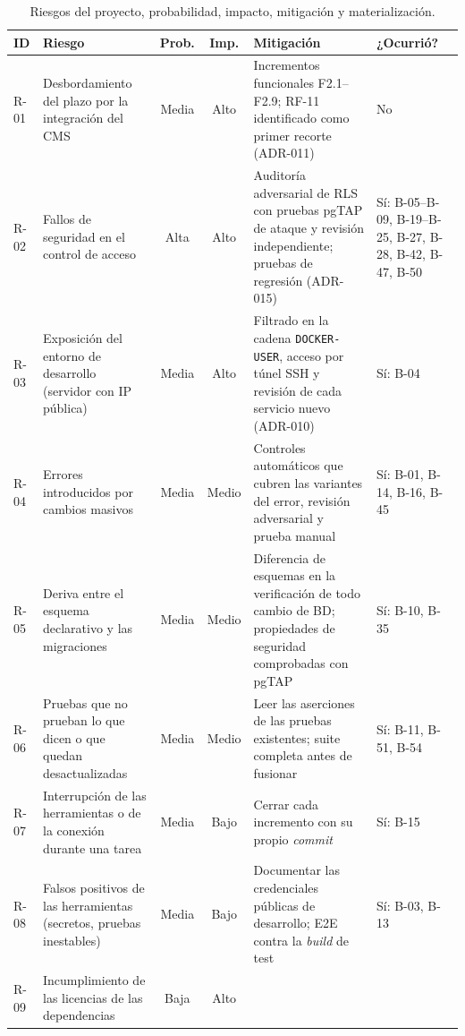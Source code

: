 \begin{table}[htbp]
  \centering
  \footnotesize
  \caption{Riesgos del proyecto, probabilidad, impacto, mitigación y materialización.}
  \label{tab:plan-riesgos}
  \setlength{\tabcolsep}{4pt}
  \begin{tabularx}{\textwidth}{@{}l>{\raggedright\arraybackslash}p{2.8cm}cc>{\raggedright\arraybackslash}X>{\raggedright\arraybackslash}p{2.2cm}@{}}
    \toprule
    \textbf{ID} & \textbf{Riesgo} & \textbf{Prob.} & \textbf{Imp.} & \textbf{Mitigación} & \textbf{¿Ocurrió?} \\
    \midrule
    R-01 & Desbordamiento del plazo por la integración del CMS & Media & Alto &
      Incrementos funcionales F2.1--F2.9; RF-11 identificado como primer recorte (ADR-011) & No \\
    R-02 & Fallos de seguridad en el control de acceso & Alta & Alto &
      Auditoría adversarial de RLS con pruebas pgTAP de ataque y revisión independiente; pruebas de regresión (ADR-015) & Sí: B-05--B-09, B-19--B-25, B-27, B-28, B-42, B-47, B-50 \\
    R-03 & Exposición del entorno de desarrollo (servidor con IP pública) & Media & Alto &
      Filtrado en la cadena \texttt{DOCKER-USER}, acceso por túnel SSH y revisión de cada servicio nuevo (ADR-010) & Sí: B-04 \\
    R-04 & Errores introducidos por cambios masivos & Media & Medio &
      Controles automáticos que cubren las variantes del error, revisión adversarial y prueba manual & Sí: B-01, B-14, B-16, B-45 \\
    R-05 & Deriva entre el esquema declarativo y las migraciones & Media & Medio &
      Diferencia de esquemas en la verificación de todo cambio de BD; propiedades de seguridad comprobadas con pgTAP & Sí: B-10, B-35 \\
    R-06 & Pruebas que no prueban lo que dicen o que quedan desactualizadas & Media & Medio &
      Leer las aserciones de las pruebas existentes; suite completa antes de fusionar & Sí: B-11, B-51, B-54 \\
    R-07 & Interrupción de las herramientas o de la conexión durante una tarea & Media & Bajo &
      Cerrar cada incremento con su propio \textit{commit} & Sí: B-15 \\
    R-08 & Falsos positivos de las herramientas (secretos, pruebas inestables) & Media & Bajo &
      Documentar las credenciales públicas de desarrollo; E2E contra la \textit{build} de test & Sí: B-03, B-13 \\
    R-09 & Incumplimiento de las licencias de las dependencias & Baja & Alto &

\end{tabularx}
\end{table}
